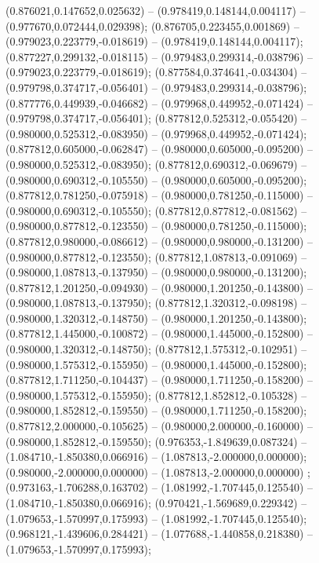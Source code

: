  (0.876021,0.147652,0.025632) -- (0.978419,0.148144,0.004117) -- (0.977670,0.072444,0.029398);
 (0.876705,0.223455,0.001869) -- (0.979023,0.223779,-0.018619) -- (0.978419,0.148144,0.004117);
 (0.877227,0.299132,-0.018115) -- (0.979483,0.299314,-0.038796) -- (0.979023,0.223779,-0.018619);
 (0.877584,0.374641,-0.034304) -- (0.979798,0.374717,-0.056401) -- (0.979483,0.299314,-0.038796);
 (0.877776,0.449939,-0.046682) -- (0.979968,0.449952,-0.071424) -- (0.979798,0.374717,-0.056401);
 (0.877812,0.525312,-0.055420) -- (0.980000,0.525312,-0.083950) -- (0.979968,0.449952,-0.071424);
 (0.877812,0.605000,-0.062847) -- (0.980000,0.605000,-0.095200) -- (0.980000,0.525312,-0.083950);
 (0.877812,0.690312,-0.069679) -- (0.980000,0.690312,-0.105550) -- (0.980000,0.605000,-0.095200);
 (0.877812,0.781250,-0.075918) -- (0.980000,0.781250,-0.115000) -- (0.980000,0.690312,-0.105550);
 (0.877812,0.877812,-0.081562) -- (0.980000,0.877812,-0.123550) -- (0.980000,0.781250,-0.115000);
 (0.877812,0.980000,-0.086612) -- (0.980000,0.980000,-0.131200) -- (0.980000,0.877812,-0.123550);
 (0.877812,1.087813,-0.091069) -- (0.980000,1.087813,-0.137950) -- (0.980000,0.980000,-0.131200);
 (0.877812,1.201250,-0.094930) -- (0.980000,1.201250,-0.143800) -- (0.980000,1.087813,-0.137950);
 (0.877812,1.320312,-0.098198) -- (0.980000,1.320312,-0.148750) -- (0.980000,1.201250,-0.143800);
 (0.877812,1.445000,-0.100872) -- (0.980000,1.445000,-0.152800) -- (0.980000,1.320312,-0.148750);
 (0.877812,1.575312,-0.102951) -- (0.980000,1.575312,-0.155950) -- (0.980000,1.445000,-0.152800);
 (0.877812,1.711250,-0.104437) -- (0.980000,1.711250,-0.158200) -- (0.980000,1.575312,-0.155950);
 (0.877812,1.852812,-0.105328) -- (0.980000,1.852812,-0.159550) -- (0.980000,1.711250,-0.158200);
 (0.877812,2.000000,-0.105625) -- (0.980000,2.000000,-0.160000) -- (0.980000,1.852812,-0.159550);
 (0.976353,-1.849639,0.087324) -- (1.084710,-1.850380,0.066916) -- (1.087813,-2.000000,0.000000);
 (0.980000,-2.000000,0.000000) -- (1.087813,-2.000000,0.000000) ;
 (0.973163,-1.706288,0.163702) -- (1.081992,-1.707445,0.125540) -- (1.084710,-1.850380,0.066916);
 (0.970421,-1.569689,0.229342) -- (1.079653,-1.570997,0.175993) -- (1.081992,-1.707445,0.125540);
 (0.968121,-1.439606,0.284421) -- (1.077688,-1.440858,0.218380) -- (1.079653,-1.570997,0.175993);
